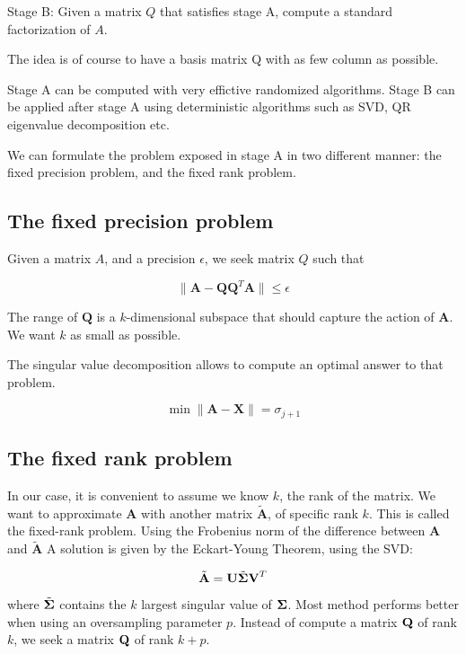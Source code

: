 \documentclass[onecolumn,12pt]{article}
\begin{document}
Stage B: Given a matrix $Q$ that satisfies stage A, compute a standard
factorization of $A$.

The idea is of course to have a basis matrix Q with as few column as possible.

Stage A can be computed with very effictive randomized algorithms. Stage B can
be applied after stage A using deterministic algorithms such as SVD, QR
eigenvalue decomposition etc.

We can formulate the problem exposed in stage A in two different manner: the
fixed precision problem, and the fixed rank problem.

\subsection{The fixed precision problem}

Given a matrix $A$, and a precision $\epsilon$, we seek matrix $Q$ such that

\begin{equation}
\label{fixed-precision-pbm}
\lVert \textbf{A} - \textbf{Q}\textbf{Q}^T \textbf{A} \lVert \leq \epsilon
\end{equation}

The range of $\textbf{Q}$ is a $k$-dimensional subspace that should capture
the action of $\textbf{A}$. We want $k$ as small as possible.

The singular value decomposition allows to compute an optimal answer to that
problem.

\begin{equation}
\label{eckart-young-thm}
\min \lVert \textbf{A} - \textbf{X} \lVert = \sigma_{j + 1}
\end{equation}

\subsection{The fixed rank problem}

In our case, it is convenient to assume we know $k$, the rank of the matrix.
We want to approximate $\textbf{A}$ with another matrix $\tilde{\textbf{A}}$,
of specific rank $k$. This is called the fixed-rank problem. Using the
Frobenius norm of the difference between $\textbf{A}$ and $\tilde{\textbf{A}}$
A solution is given by the  Eckart-Young Theorem, using the SVD:

$$\tilde{\textbf{A}} = \textbf{U} \tilde{\bold{\Sigma}} \textbf{V}^T$$

where $\tilde{\bold{\Sigma}}$ contains the $k$ largest singular value of
$\bold{\Sigma}$. Most method performs better when using an oversampling
parameter $p$.  Instead of compute a matrix $\bold{Q}$ of rank
$k$, we seek a matrix $\bold{Q}$ of rank $k + p$.
\end{document}
